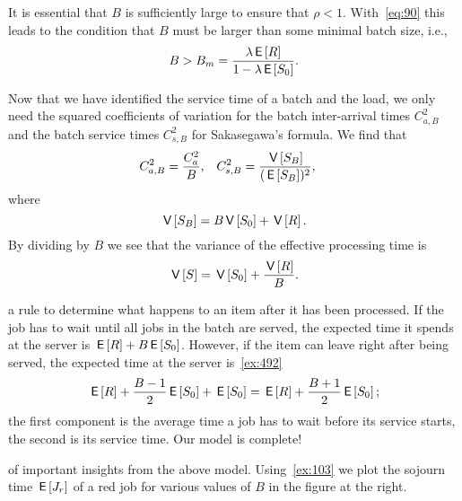 It is essential that $B$ is sufficiently large to ensure that $\rho<1$.
With~\cref{eq:90} this leads to the condition that $B$ must be larger than some minimal batch size, i.e., 
\begin{equation*}
B> B_m = \frac{\lambda \,\mathsf{E}\left[R\right]}{1-\lambda \,\mathsf{E}\left[S_0\right]}.
\end{equation*}

Now that we have identified the service time of a batch and the load, we only need the squared coefficients of variation for the batch inter-arrival times $C_{a,B}^2$ and the batch service times $C_{s,B}^2$ for Sakasegawa's formula.
We find that
 \begin{align}\label{eq:82}
C_{a,B}^2 &= \frac{C_{a}^2}B, &
C_{s, B}^2 &= \frac{\,\mathsf{V}\left[S_B\right]}{(\,\mathsf{E}\left[S_B\right])^2},
\end{align}
where
\begin{equation*}
  \,\mathsf{V}\left[S_B\right] = B \,\mathsf{V}\left[S_0\right] + \,\mathsf{V}\left[R\right].
\end{equation*}
By dividing by $B$ we see that the variance of the effective processing time is
\begin{equation}  \label{eq:107}
  \,\mathsf{V}\left[S\right] = \,\mathsf{V}\left[S_0\right] + \frac{\,\mathsf{V}\left[R\right]}{B}.
\end{equation}

 a rule to determine what happens to an item after it has been processed.
If the job has to wait until all jobs in the batch are served, the expected time it spends at the server is $\,\mathsf{E}\left[R\right] + B \,\mathsf{E}\left[S_0\right]$.
However, if the item can leave 
right after being served, the expected time at the server is~\cref{ex:492}
\begin{equation}\label{eq:85}
\,\mathsf{E}\left[R\right] + \frac{B-1}{2}\,\mathsf{E}\left[S_0\right] + \,\mathsf{E}\left[S_0\right]= \,\mathsf{E}\left[R\right] + \frac{B+1}{2}\,\mathsf{E}\left[S_0\right];
\end{equation}
the first component is the average time a job has to wait before its service starts, the second is its service time. 
Our model is complete!


 
 of important insights from the above model.
Using~\cref{ex:103} we plot the sojourn time $\,\mathsf{E}\left[J_r\right]$ of a red job for various values of $B$ in the figure at the right.



